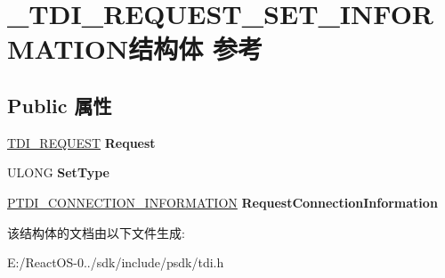 \hypertarget{struct___t_d_i___r_e_q_u_e_s_t___s_e_t___i_n_f_o_r_m_a_t_i_o_n}{}\section{\+\_\+\+T\+D\+I\+\_\+\+R\+E\+Q\+U\+E\+S\+T\+\_\+\+S\+E\+T\+\_\+\+I\+N\+F\+O\+R\+M\+A\+T\+I\+O\+N结构体 参考}
\label{struct___t_d_i___r_e_q_u_e_s_t___s_e_t___i_n_f_o_r_m_a_t_i_o_n}
\subsection*{Public 属性}
\begin{DoxyCompactItemize}
\item 
\mbox{\label{struct___t_d_i___r_e_q_u_e_s_t___s_e_t___i_n_f_o_r_m_a_t_i_o_n_a0120bd380016d892ae948d3606aef44a}} 
\hyperlink{struct___t_d_i___r_e_q_u_e_s_t}{T\+D\+I\+\_\+\+R\+E\+Q\+U\+E\+ST} {\bfseries Request}
\item 
\mbox{\label{struct___t_d_i___r_e_q_u_e_s_t___s_e_t___i_n_f_o_r_m_a_t_i_o_n_a7c73095065cc7a4bad98ce3fbc343105}} 
U\+L\+O\+NG {\bfseries Set\+Type}
\item 
\mbox{\label{struct___t_d_i___r_e_q_u_e_s_t___s_e_t___i_n_f_o_r_m_a_t_i_o_n_a29813a55a1f52c858051144529b3c32d}} 
\hyperlink{struct___t_d_i___c_o_n_n_e_c_t_i_o_n___i_n_f_o_r_m_a_t_i_o_n}{P\+T\+D\+I\+\_\+\+C\+O\+N\+N\+E\+C\+T\+I\+O\+N\+\_\+\+I\+N\+F\+O\+R\+M\+A\+T\+I\+ON} {\bfseries Request\+Connection\+Information}
\end{DoxyCompactItemize}


该结构体的文档由以下文件生成\+:\begin{DoxyCompactItemize}
\item 
E\+:/\+React\+O\+S-\/0../sdk/include/psdk/tdi.\+h\end{DoxyCompactItemize}
